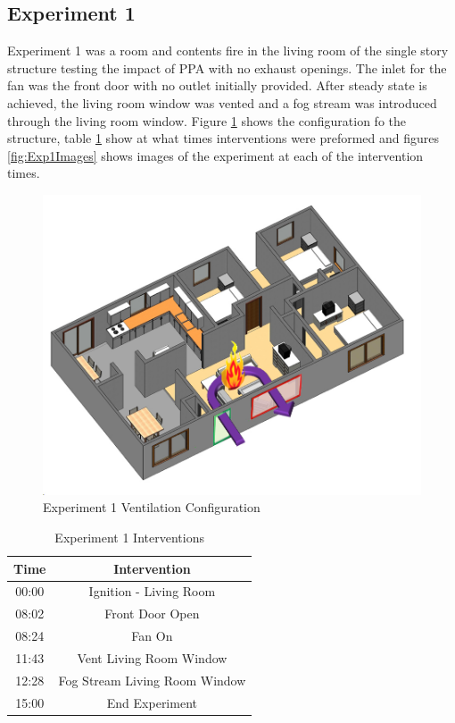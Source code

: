 \documentclass{article}
\begin{document}
\subsection{Experiment 1}
Experiment 1 was a room and contents fire in the living room of the single story structure testing the impact of PPA with no exhaust openings. The inlet for the fan was the front door with no outlet initially provided. After steady state is achieved, the living room window was vented and a fog stream was introduced through the living room window. Figure \ref{fig:Exp1VentConfig} shows the configuration fo the structure, table \ref{Table:Exp1Interventions} show at what times interventions were preformed and figures \ref{fig:Exp1Images} shows images of the experiment at each of the intervention times.

 \begin{figure}[h!]
 	\centering
 	\includegraphics[width=5in]{0_Images/FireExperiments/Single_Story/Experiment_1.jpg}
 	\caption{Experiment 1 Ventilation Configuration}
 	\label{fig:Exp1VentConfig}
 \end{figure}

\begin{table}[H]
	\centering
	\caption{Experiment 1 Interventions}
	\begin{tabular}{|c|c|} 
		\hline
		Time & Intervention \\ \hline \hline
		00:00 & Ignition - Living Room \\ \hline
		08:02 & Front Door Open \\ \hline
		08:24 & Fan On \\ \hline
		11:43 & Vent Living Room Window \\ \hline
		12:28 & Fog Stream Living Room Window \\ \hline
		15:00 & End Experiment\\ \hline
	\end{tabular}
	\label{Table:Exp1Interventions}
\end{table}
\end{document}
